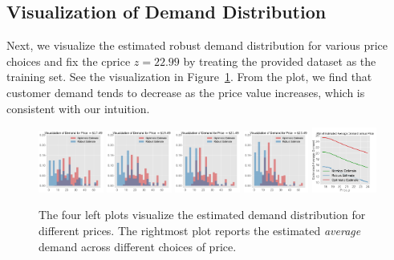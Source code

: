 \documentclass[competition,nonblindrev, 12pt]{informs3-competition}
\theoremstyle{TH}%
\theoremstyle{TH}%
\begin{document}
\subsection{Visualization of Demand Distribution}
Next, we visualize the estimated robust demand distribution for various price choices and fix the cprice $z=22.99$ by treating the provided dataset as the training set.
See the visualization in Figure~\ref{fig:price:demand}.
From the plot, we find that customer demand tends to decrease as the price value increases, which is consistent with our intuition.
\begin{figure}[H]
\vspace{-1.8em}
    \centering
    \includegraphics[width=0.19\textwidth]{Plot_Histogram_Demand_1.pdf}
    \includegraphics[width=0.19\textwidth]{Plot_Histogram_Demand_2.pdf}
    \includegraphics[width=0.19\textwidth]{Plot_Histogram_Demand_3.pdf}
    \includegraphics[width=0.19\textwidth]{Plot_Histogram_Demand_4.pdf}
    \includegraphics[width=0.19\textwidth]{demand_summary.pdf}
    \caption{The four left plots visualize the estimated demand distribution for different prices. The rightmost plot reports the estimated \emph{average} demand across different choices of price.}
    \label{fig:price:demand}
    \vspace{-2em}
\end{figure}
\end{document}
